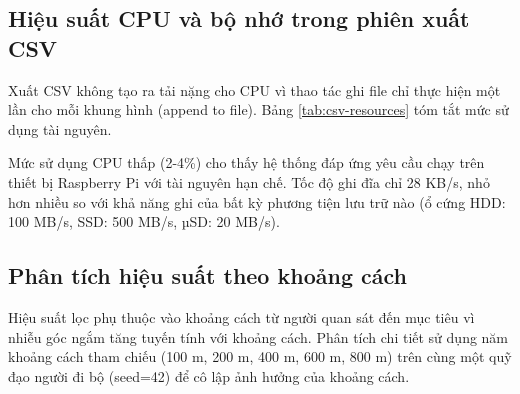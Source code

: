 \subsection{Hiệu suất CPU và bộ nhớ trong phiên xuất CSV}

\hspace{0.5cm} Xuất CSV không tạo ra tải nặng cho CPU vì thao tác ghi file chỉ thực hiện một lần cho mỗi khung hình (append to file). Bảng \ref{tab:csv-resources} tóm tắt mức sử dụng tài nguyên.

\begin{table}[H]
\centering
\caption{Tài nguyên hệ thống trong phiên xuất CSV}
\label{tab:csv-resources}
\end{table}

Mức sử dụng CPU thấp (2-4\%) cho thấy hệ thống đáp ứng yêu cầu chạy trên thiết bị Raspberry Pi với tài nguyên hạn chế. Tốc độ ghi đĩa chỉ 28 KB/s, nhỏ hơn nhiều so với khả năng ghi của bất kỳ phương tiện lưu trữ nào (ổ cứng HDD: 100 MB/s, SSD: 500 MB/s, µSD: 20 MB/s).

\subsection{Phân tích hiệu suất theo khoảng cách}

\hspace{0.5cm} Hiệu suất lọc phụ thuộc vào khoảng cách từ người quan sát đến mục tiêu vì nhiễu góc ngắm tăng tuyến tính với khoảng cách. Phân tích chi tiết sử dụng năm khoảng cách tham chiếu (100 m, 200 m, 400 m, 600 m, 800 m) trên cùng một quỹ đạo người đi bộ (seed=42) để cô lập ảnh hưởng của khoảng cách.

